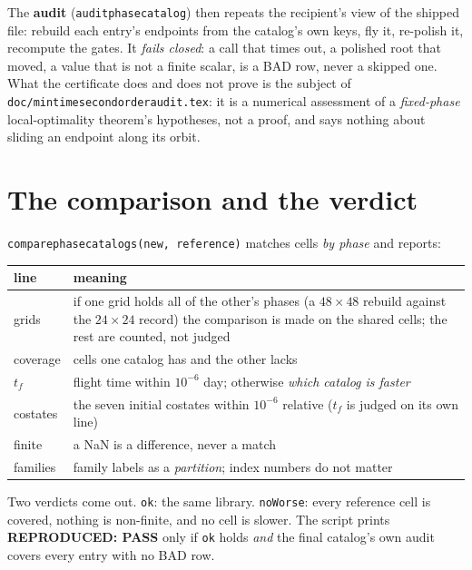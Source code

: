 \documentclass[11pt]{article}
\renewcommand{\_}{\textunderscore\allowbreak}
\newcommand{\code}[1]{\texttt{#1}}
\newcommand{\file}[1]{\texttt{\small #1}}
\begin{document}
The \textbf{audit} (\code{audit\_phase\_catalog}) then repeats the
recipient's view of the shipped file: rebuild each entry's endpoints from
the catalog's own keys, fly it, re-polish it, recompute the gates. It
\emph{fails closed}: a call that times out, a polished root that moved, a
value that is not a finite scalar, is a BAD row, never a skipped one.
What the certificate does and does not prove is the subject of
\file{doc/mintime\_second\_order\_audit.tex}: it is a numerical assessment
of a \emph{fixed-phase} local-optimality theorem's hypotheses, not a proof,
and says nothing about sliding an endpoint along its orbit.

\section{The comparison and the verdict}\label{sec:compare}

\code{compare\_phase\_catalogs(new, reference)} matches cells \emph{by
phase} and reports:

\begin{center}\small
\begin{tabular}{@{}lL{0.72\textwidth}@{}}
\toprule
line & meaning \\
\midrule
grids & if one grid holds all of the other's phases (a $48\times48$ rebuild against the $24\times24$ record) the comparison is made on the shared cells; the rest are counted, not judged \\
coverage & cells one catalog has and the other lacks \\
$t_f$ & flight time within $10^{-6}$ day; otherwise \emph{which catalog is faster} \\
costates & the seven initial costates within $10^{-6}$ relative ($t_f$ is judged on its own line) \\
finite & a NaN is a difference, never a match \\
families & family labels as a \emph{partition}; index numbers do not matter \\
\bottomrule
\end{tabular}
\end{center}

\noindent Two verdicts come out. \code{ok}: the same library. \code{noWorse}:
every reference cell is covered, nothing is non-finite, and no cell is
slower. The script prints \textbf{REPRODUCED: PASS} only if \code{ok} holds
\emph{and} the final catalog's own audit covers every entry with no BAD row.
\end{document}
